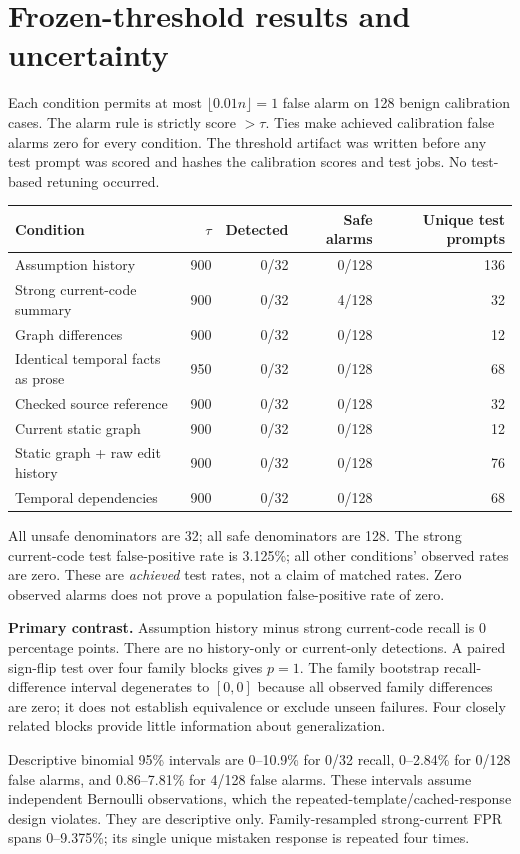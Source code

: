 \documentclass[10pt,letterpaper]{article}
\begin{document}
\clearpage
\section{Frozen-threshold results and uncertainty}
Each condition permits at most $\lfloor0.01n\rfloor=1$ false alarm on 128 benign calibration cases. The alarm rule is strictly score $>\tau$. Ties make achieved calibration false alarms zero for every condition. The threshold artifact was written before any test prompt was scored and hashes the calibration scores and test jobs. No test-based retuning occurred.

\begin{tabularx}{\linewidth}{@{}Yrrrr@{}}\toprule
Condition & $\tau$ & Detected & Safe alarms & Unique test prompts\\\midrule
Assumption history & 900 & 0/32 & 0/128 & 136\\
Strong current-code summary & 900 & 0/32 & 4/128 & 32\\
Graph differences & 900 & 0/32 & 0/128 & 12\\
Identical temporal facts as prose & 950 & 0/32 & 0/128 & 68\\
Checked source reference & 900 & 0/32 & 0/128 & 32\\
Current static graph & 900 & 0/32 & 0/128 & 12\\
Static graph + raw edit history & 900 & 0/32 & 0/128 & 76\\
Temporal dependencies & 900 & 0/32 & 0/128 & 68\\
\bottomrule\end{tabularx}

All unsafe denominators are 32; all safe denominators are 128. The strong current-code test false-positive rate is 3.125\%; all other conditions' observed rates are zero. These are \emph{achieved} test rates, not a claim of matched rates. Zero observed alarms does not prove a population false-positive rate of zero.

\textbf{Primary contrast.} Assumption history minus strong current-code recall is 0 percentage points. There are no history-only or current-only detections. A paired sign-flip test over four family blocks gives $p=1$. The family bootstrap recall-difference interval degenerates to $[0,0]$ because all observed family differences are zero; it does not establish equivalence or exclude unseen failures. Four closely related blocks provide little information about generalization.

Descriptive binomial 95\% intervals are 0--10.9\% for 0/32 recall, 0--2.84\% for 0/128 false alarms, and 0.86--7.81\% for 4/128 false alarms. These intervals assume independent Bernoulli observations, which the repeated-template/cached-response design violates. They are descriptive only. Family-resampled strong-current FPR spans 0--9.375\%; its single unique mistaken response is repeated four times.
\end{document}
